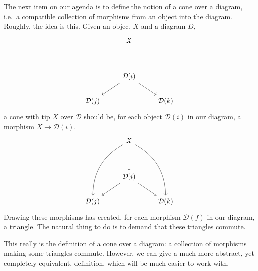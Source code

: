 \documentclass[notes.tex]{subfiles}
\begin{document}
The next item on our agenda is to define the notion of a cone over a diagram, i.e.\ a compatible collection of morphisms from an object into the diagram. Roughly, the idea is this. Given an object $X$ and a diagram $D$,
\begin{equation*}
  \begin{tikzcd}
    & X
    \\
    \\
    & \mathcal{D}(i)
    \arrow[dr]
    \arrow[dl]
    \\
    \mathcal{D}(j)
    && \mathcal{D}(k)
  \end{tikzcd}
\end{equation*}
a cone with tip $X$ over $\mathcal{D}$ should be, for each object $\mathcal{D}(i)$ in our diagram, a morphism $X \to \mathcal{D}(i)$.
\begin{equation*}
  \begin{tikzcd}
    & X
    \arrow[dddl, bend right]
    \arrow[dddr, bend left]
    \arrow[dd]
    \\
    \\
    & \mathcal{D}(i)
    \arrow[dr]
    \arrow[dl]
    \\
    \mathcal{D}(j)
    && \mathcal{D}(k)
  \end{tikzcd}
\end{equation*}
Drawing these morphisms has created, for each morphism $\mathcal{D}(f)$ in our diagram, a triangle. The natural thing to do is to demand that these triangles commute.

This really is the definition of a cone over a diagram: a collection of morphisms making some triangles commute. However, we can give a much more abstract, yet completely equivalent, definition, which will be much easier to work with.
\end{document}
